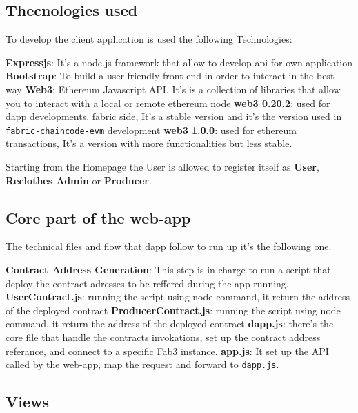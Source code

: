 {\subsection{Thecnologies used}

To develop the client application is used the following Technologies:

\begin{outline}
    \1 \textbf{Expressjs}: It's a node.js framework that allow to develop api for own application
    \1 \textbf{Bootstrap}: To build a user friendly front-end in order to interact in the best way
    \1 \textbf{Web3}: Ethereum Javascript API, It's is a collection of libraries that allow you to interact with a local or remote ethereum node 
    \2 \textbf{web3 0.20.2}: used for dapp developments, fabric side, It's a stable version and it's the version
    used in \texttt{fabric-chaincode-evm} development
    \2 \textbf{web3 1.0.0}: used for ethereum transactions, It's a version with more functionalities but less stable.
\end{outline}

Starting from the Homepage the User is allowed to register itself as \textbf{User}, \textbf{Reclothes Admin}
or \textbf{Producer}.

\subsection{Core part of the web-app}

The technical files and flow that dapp follow to run up it's the following one.

\begin{outline}[enumerate]
    \1 \textbf{Contract Address Generation}:
    \2 This step is in charge to run a script that deploy the contract adresses to be reffered during the 
    app running.
    \3 \textbf{UserContract.js}: running the script using node command, it return the address of the deployed contract
    \3 \textbf{ProducerContract.js}: running the script using node command, it return the address of the deployed contract
    \1  \textbf{dapp.js}: there's the core file that handle the contracts invokations, set up the contract address
    referance, and connect to a specific Fab3 instance.
    \1 \textbf{app.js}: It set up the API called by the web-app, map the request and forward to \texttt{dapp.js}.
\end{outline}

\subsection{Views}

}

